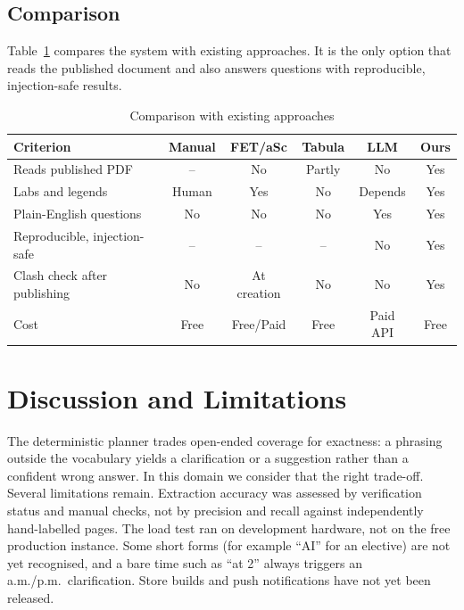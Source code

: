 \documentclass[conference]{IEEEtran}
\begin{document}
\subsection{Comparison}
Table~\ref{tab:compare} compares the system with existing approaches. It is the only option that reads
the published document and also answers questions with reproducible, injection-safe results.

\begin{table}[t]
\centering
\caption{Comparison with existing approaches}
\label{tab:compare}
\setlength{\tabcolsep}{2pt}
\footnotesize
\begin{tabular}{@{}lccccc@{}}
\toprule
\textbf{Criterion} & \textbf{Manual} & \textbf{FET/aSc} & \textbf{Tabula} & \textbf{LLM} & \textbf{Ours}\\
\midrule
Reads published PDF & -- & No & Partly & No & Yes\\
Labs and legends & Human & Yes & No & Depends & Yes\\
Plain-English questions & No & No & No & Yes & Yes\\
Reproducible, injection-safe & -- & -- & -- & No & Yes\\
Clash check after publishing & No & At creation & No & No & Yes\\
Cost & Free & Free/Paid & Free & Paid API & Free\\
\bottomrule
\end{tabular}
\end{table}

\section{Discussion and Limitations}
The deterministic planner trades open-ended coverage for exactness: a phrasing outside the vocabulary
yields a clarification or a suggestion rather than a confident wrong answer. In this domain we consider
that the right trade-off. Several limitations remain. Extraction accuracy was assessed by verification
status and manual checks, not by precision and recall against independently hand-labelled pages. The load
test ran on development hardware, not on the free production instance. Some short forms (for example
``AI'' for an elective) are not yet recognised, and a bare time such as ``at 2'' always triggers an
a.m./p.m.\ clarification. Store builds and push notifications have not yet been released.
\end{document}
